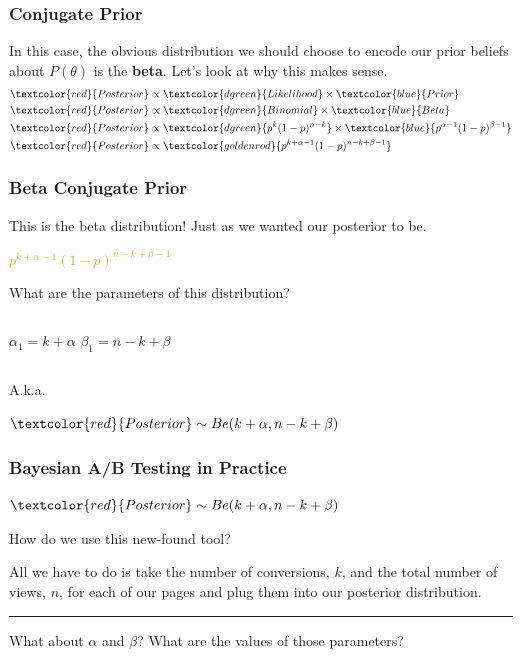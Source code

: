 \documentclass{beamer}
\begin{document}
\begin{frame}
  \frametitle{Conjugate Prior}
  In this case, the obvious distribution we should choose to encode our prior beliefs about $ P(\theta) $ is the \textbf{beta}. Let's look at why this makes sense.
  \begin{align*}
    \textcolor{red}{Posterior} &\propto \textcolor{dgreen}{Likelihood} \times \textcolor{blue}{Prior} \\
    \textcolor{red}{Posterior} &\propto \textcolor{dgreen}{Binomial} \times \textcolor{blue}{Beta} \\
    \textcolor{red}{Posterior} &\propto \textcolor{dgreen}{p^{k}(1-p)^{n-k}} \times \textcolor{blue}{p^{\alpha-1}(1-p)^{\beta-1}} \\
    \textcolor{red}{Posterior} &\propto \textcolor{goldenrod}{p^{k+\alpha-1}(1-p)^{n-k+\beta-1}}
  \end{align*}
\end{frame}

\begin{frame}
  \frametitle{Beta Conjugate Prior}
  {\large This is the beta distribution! Just as we wanted our posterior to be.} \vspace{3mm}

  \begin{center}
    \textcolor{goldenrod}{$ p^{k+\alpha-1}(1-p)^{n-k+\beta-1} $} \vspace{3mm}
  \end{center}

  What are the parameters of this distribution? \vspace{3mm}
  \pause

  \begin{center}
  \begin{columns}
    $ \alpha_1 = k+\alpha $
    $ \beta_1 = n-k+\beta $
  \end{columns}
  \end{center} \vspace{-2mm}
  {\large A.k.a.}
  \begin{center}
    $ \textcolor{red}{Posterior} \sim Be(k+\alpha, n-k+\beta) $
  \end{center}
\end{frame}

\begin{frame}
  \frametitle{Bayesian A/B Testing in Practice}
  \begin{center}
    $ \textcolor{red}{Posterior} \sim Be(k+\alpha, n-k+\beta) $
  \end{center} \vspace{5mm}
  How do we use this new-found tool? \vspace{3mm}

  All we have to do is take the number of conversions, $k$, and the total number of views, $n$, for each of our pages and plug them into our posterior distribution. \vspace{2mm}
  \pause

  \noindent\hfil\rule{\textwidth}{.4pt}\hfil \vspace{4mm}
  What about $\alpha$ and $\beta$? What are the values of those parameters?
\end{frame}
\end{document}

